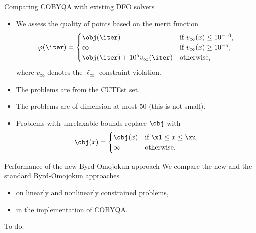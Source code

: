 \documentclass[optimization]{common/talk}
\begin{document}
\begin{frame}{Comparing COBYQA with existing DFO solvers}
    \begin{itemize}
        \item We assess the quality of points based on the merit function
        \begin{equation*}
            \varphi(\iter) =
            \begin{cases}
                \obj(\iter)                           & \text{if $v_{\infty}(x) \le 10^{-10}$,}\\
                \infty                                & \text{if $v_{\infty}(x) \ge 10^{-5}$,}\\
                \obj(\iter) + 10^5 v_{\infty}(\iter)  & \text{otherwise,}
            \end{cases}
        \end{equation*}
        where $v_{\infty}$ denotes the $\ell_{\infty}$-constraint violation.
        \item The problems are from the \alert{CUTEst} set.
        \item The problems are of \alert{dimension} at most \num{50} (this is \alert{not} small).
        \item Problems with \alert{unrelaxable} bounds replace $\obj$ with
        \begin{equation*}
            \tilde{\obj}(x) =
            \begin{cases}
                \obj(x) & \text{if $\xl \le x \le \xu$,}\\
                \infty  & \text{otherwise.}
            \end{cases}
        \end{equation*}
    \end{itemize}
\end{frame}

\begin{frame}{Performance of the new Byrd-Omojokun approach}
    We compare the new and the standard Byrd-Omojokun approaches
    \begin{itemize}
        \item on \alert{linearly} and \alert{nonlinearly constrained} problems,
        \item in the implementation of COBYQA.
    \end{itemize}

    \smallskip

    To do.

\end{frame}
\end{document}
